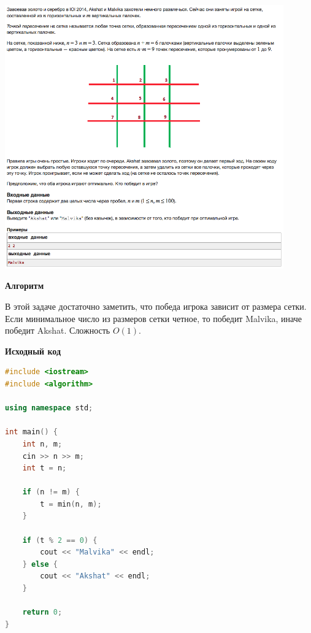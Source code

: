 \documentclass[a4paper,12pt]{article}
\begin{document}
\begin{center}
\includegraphics[width=0.9\textwidth]{C_258/A.png}\\ [1cm]
\end{center}

\textbf{{\large Алгоритм}}

В этой задаче достаточно заметить, что победа игрока зависит от размера сетки. Если минимальное число из размеров сетки четное, то победит Malvika, иначе победит Akshat. Сложность $O(1)$.\\

\newpage

\textbf{{\large Исходный код}} \\
\begin{lstlisting}[language=C++]
#include <iostream>
#include <algorithm>

using namespace std;

int main() {
    int n, m;
    cin >> n >> m;
    int t = n;
    
    if (n != m) {
        t = min(n, m);
    }
    
    if (t % 2 == 0) {
        cout << "Malvika" << endl;
    } else {
        cout << "Akshat" << endl;
    }
    
    return 0;
}
\end{lstlisting}




%
%
\end{document}
